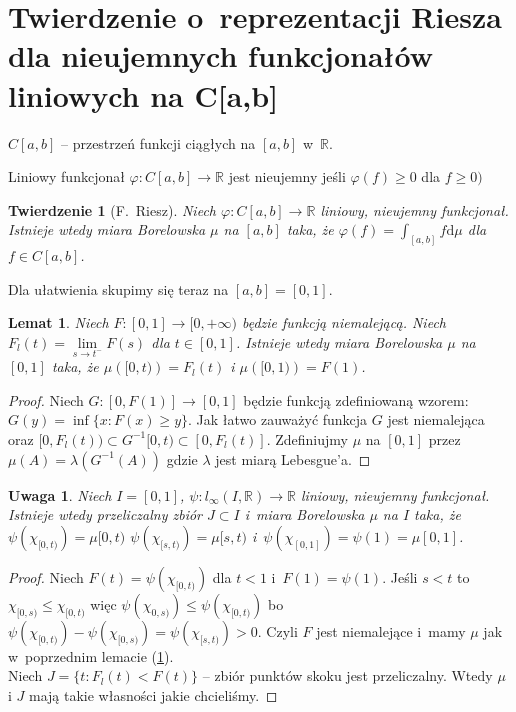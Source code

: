 \documentclass[11pt]{mwrep}
\renewcommand{\[}{\begin{equation}}
\renewcommand{\]}{\end{equation}}
\newcommand{\R}{{\ensuremath{\mathbb R}}}
\newcommand{\dd}{\mathrm{d}}
\newtheorem{twr}[subsection]{Twierdzenie}%
\newtheorem{lem}[subsection]{Lemat}
\newtheorem{uwaga}[subsection]{Uwaga}
\begin{document}
\section{Twierdzenie o~reprezentacji  Riesza dla nieujemnych funkcjonałów liniowych na C[a,b]}
$C[a,b]$ -- przestrzeń funkcji ciągłych na $[a,b]$ w~$\R$.\par
Liniowy funkcjonał $\varphi:C[a,b]\to \R$ jest nieujemny jeśli $\varphi(f)\ge 0$ dla $f \ge 0)$
\begin{twr}[F.~Riesz]
Niech $\varphi:C[a,b]\to \R$ liniowy, nieujemny  funkcjonał.
Istnieje wtedy miara Borelowska $\mu$ na $[a,b]$ taka, że $\varphi(f) = \int_{[a,b]} f \dd \mu$ dla $f\in C[a,b]$.
\end{twr}
Dla ułatwienia skupimy się teraz na $[a,b]=[0,1]$.
\begin{lem} \label{lem:Riesz1}
  Niech $F\colon[0,1]\to [0,+\infty)$ będzie funkcją niemalejącą. Niech $F_l(t) = \lim\limits_{s\to t^-} F(s)$ dla $t\in[0,1]$. 
  Istnieje wtedy miara Borelowska $\mu$ na $[0,1]$
  taka, że $\mu\left( [0,t) \right) = F_{l}(t)$ i $\mu\left( [0,1) \right) = F(1)$.
\end{lem}
\begin{proof}
			Niech $G\colon[0,F(1)] \to [0,1]$ będzie funkcją zdefiniowaną wzorem: $G(y) = \inf\{x: F(x) \ge y\}$.
			Jak łatwo zauważyć funkcja $G$ jest niemalejąca oraz  $[0,F_l(t)) \subset G^{-1}[0,t)\subset [0,F_l(t)]$.
			Zdefiniujmy $\mu$ na $[0,1]$ przez $\mu(A) = \lambda(G^{-1}(A))$ gdzie $\lambda$ jest miarą Lebesgue'a.
\end{proof}
\begin{uwaga}
	Niech $I=[0,1]$, $\psi: l_\infty (I,\R)\to \R$ liniowy, nieujemny  funkcjonał. 
	Istnieje wtedy  przeliczalny zbiór $J\subset I$ i~miara Borelowska $\mu$ na $I$ taka, że $\psi\left(\chi_{[0,t)} \right) = \mu[0,t)$ 
		$\psi \left( \chi_{[s,t)}  \right)  = \mu[s,t)$ i~$\psi(\chi_{[0,1]}) = \psi(1) = \mu[0,1]$.
\end{uwaga}
\begin{proof}
	Niech $F(t) = \psi\left( \chi_{[0,t)} \right)$ dla $t<1$ i~$F(1) = \psi(1)$.
	Jeśli $s<t$ to $\chi_{[0,s)} \le \chi_{[0,t)}$ więc $\psi\left( \chi_{0,s)} \right) \le \psi \left( \chi_{[0,t)} \right)$
		bo $\psi (\chi_{[0,t)} ) - \psi (\chi_{[0,s)}) = \psi(\chi_{[s,t)}) >0$.
	Czyli $F$ jest niemalejące i~mamy $\mu$ jak w~poprzednim lemacie (\ref{lem:Riesz1}).\\
	Niech $J= \{t: F_l (t) < F(t)\}$ -- zbiór punktów skoku jest przeliczalny. 
	Wtedy $\mu$ i $J$ mają takie własności jakie chcieliśmy. 
\end{proof}
\end{document}
